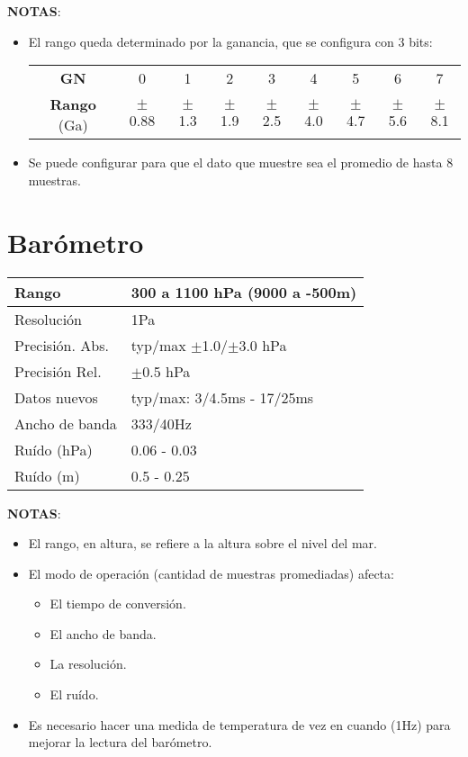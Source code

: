 \documentclass[spanish,12pt,a4paper,titlepage]{report}
\begin{document}
\textbf{NOTAS}:
\begin{itemize}
\item El rango queda determinado por la ganancia, que se configura con 3 bits:
\begin{table}[H]
\begin{center}
\begin{tabular}{|c|c|c|c|c|c|c|c|c|}
\hline
\textbf{GN} & 0 & 1 & 2 & 3 & 4 & 5 & 6 & 7 \\
\textbf{Rango} (Ga)& $\pm$0.88 & $\pm$1.3 & $\pm$1.9 & $\pm$2.5 & $\pm$4.0 & $\pm$4.7 & $\pm$5.6 & $\pm$8.1 \\
\hline
\end{tabular}
\label{tab:magn-gain}
\end{center}
\end{table}
\item Se puede configurar para que el dato que muestre sea el promedio de hasta 8 muestras.
\end{itemize}

\section{Barómetro}
\label{sec:barometro}

\begin{table}[H]
\begin{center}
\begin{tabular}{|p{3cm}|p{6.5cm}|}
\hline
Rango & 300 a 1100 hPa (9000 a -500m)\\
\hline
Resolución &  1Pa\\
\hline
Precisión. Abs. & typ/max $\pm$1.0/$\pm$3.0 hPa \\
\hline
Precisión Rel. & $\pm$0.5 hPa \\
\hline
Datos nuevos &  typ/max: 3/4.5ms - 17/25ms\\
\hline
Ancho de banda &  333/40Hz\\
\hline
Ruído (hPa) &  0.06 - 0.03\\
\hline
Ruído (m) & 0.5 - 0.25 \\
\hline
\end{tabular}
\label{tab:barometro}
\end{center}
\end{table}

\textbf{NOTAS}:
\begin{itemize}
\item El rango, en altura, se refiere a la altura sobre el nivel del mar.
\item El modo de operación (cantidad de muestras promediadas) afecta:
  \begin{itemize}
  \item El tiempo de conversión.
  \item El ancho de banda.
  \item La resolución.
  \item El ruído.
  \end{itemize}
\item Es necesario hacer una medida de temperatura de vez en cuando (1Hz) para mejorar la lectura del barómetro.
\end{itemize}
\end{document}

